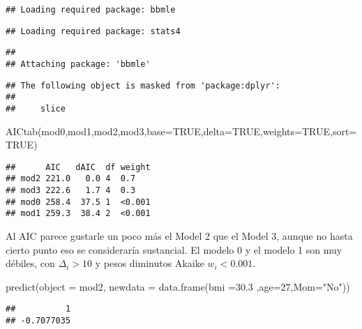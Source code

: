 \documentclass[
]{book}
\newenvironment{Shaded}{\begin{snugshade}}{\end{snugshade}}
\newcommand{\AttributeTok}[1]{\textcolor[rgb]{0.77,0.63,0.00}{#1}}
\newcommand{\ConstantTok}[1]{\textcolor[rgb]{0.00,0.00,0.00}{#1}}
\newcommand{\DecValTok}[1]{\textcolor[rgb]{0.00,0.00,0.81}{#1}}
\newcommand{\FloatTok}[1]{\textcolor[rgb]{0.00,0.00,0.81}{#1}}
\newcommand{\FunctionTok}[1]{\textcolor[rgb]{0.00,0.00,0.00}{#1}}
\newcommand{\NormalTok}[1]{#1}
\newcommand{\StringTok}[1]{\textcolor[rgb]{0.31,0.60,0.02}{#1}}
\begin{document}
\begin{verbatim}
## Loading required package: bbmle
\end{verbatim}

\begin{verbatim}
## Loading required package: stats4
\end{verbatim}

\begin{verbatim}
## 
## Attaching package: 'bbmle'
\end{verbatim}

\begin{verbatim}
## The following object is masked from 'package:dplyr':
## 
##     slice
\end{verbatim}

\begin{Shaded}
\begin{Highlighting}[]
\FunctionTok{AICtab}\NormalTok{(mod0,mod1,mod2,mod3,}\AttributeTok{base=}\ConstantTok{TRUE}\NormalTok{,}\AttributeTok{delta=}\ConstantTok{TRUE}\NormalTok{,}\AttributeTok{weights=}\ConstantTok{TRUE}\NormalTok{,}\AttributeTok{sort=}\ConstantTok{TRUE}\NormalTok{)}
\end{Highlighting}
\end{Shaded}

\begin{verbatim}
##      AIC   dAIC  df weight
## mod2 221.0   0.0 4  0.7   
## mod3 222.6   1.7 4  0.3   
## mod0 258.4  37.5 1  <0.001
## mod1 259.3  38.4 2  <0.001
\end{verbatim}

Al AIC parece gustarle un poco más el Model 2 que el Model 3, aunque no hasta cierto punto
eso se consideraría sustancial. El modelo 0 y el modelo 1 son muy débiles, con \(\Delta_i>10\) y pesos diminutos Akaike \(w_i<0.001\).

\begin{Shaded}
\begin{Highlighting}[]
\FunctionTok{predict}\NormalTok{(}\AttributeTok{object =}\NormalTok{ mod2, }\AttributeTok{newdata =} \FunctionTok{data.frame}\NormalTok{(}\AttributeTok{bmi =}\FloatTok{30.3}\NormalTok{ ,}\AttributeTok{age=}\DecValTok{27}\NormalTok{,}\AttributeTok{Mom=}\StringTok{"No"}\NormalTok{))}
\end{Highlighting}
\end{Shaded}

\begin{verbatim}
##          1 
## -0.7077035
\end{verbatim}
\end{document}
